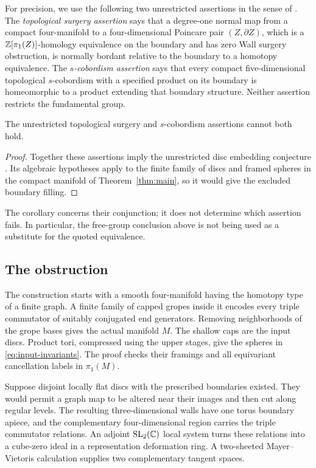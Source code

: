 For precision, we use the following two unrestricted assertions in
the sense of \cite[Conjectures~1.5--1.6]{KPT2021}. The
\emph{topological surgery assertion} says that a degree-one normal
map from a compact four-manifold to a four-dimensional Poincare pair
$(Z,\partial Z)$, which is a $\mathbb Z[\pi_1(Z)]$-homology equivalence on the boundary and has
zero Wall surgery obstruction, is normally bordant relative to the
boundary to a homotopy equivalence. The \emph{$s$-cobordism assertion}
says that every compact five-dimensional topological $s$-cobordism
with a specified product on its boundary is homeomorphic to a product
extending that boundary structure. Neither assertion restricts the
fundamental group.

\begin{corollary}\label{cor:surgery-conjunction}
The unrestricted topological surgery and $s$-cobordism assertions
cannot both hold.
\end{corollary}
\begin{proof}
Together these assertions imply the unrestricted disc embedding
conjecture \cite[Section~3]{KPT2021}. Its algebraic hypotheses apply
to the finite family of discs and framed spheres in the compact
manifold of Theorem~\ref{thm:main}, so it
would give the excluded boundary filling.
\end{proof}

The corollary concerns their conjunction; it does not determine which
assertion fails. In particular, the free-group conclusion above is
not being used as a substitute for the quoted equivalence.

\subsection{The obstruction}
The construction starts with a smooth four-manifold having the homotopy type of a finite graph. A finite family of capped gropes inside it encodes every triple commutator of suitably conjugated end generators. Removing neighborhoods of the grope bases gives the actual manifold $M$. The shallow caps are the input discs. Product tori, compressed using the upper stages, give the spheres in \eqref{eq:input-invariants}. The proof checks their framings and all equivariant cancellation labels in $\pi_1(M)$.

Suppose disjoint locally flat discs with the prescribed boundaries existed. They would permit a graph map to be altered near their images and then cut along regular levels. The resulting three-dimensional walls have one torus boundary apiece, and the complementary four-dimensional region carries the triple commutator relations. An adjoint $\operatorname{SL}_2(\mathbb C)$ local system turns these relations into a cube-zero ideal in a representation deformation ring. A two-sheeted Mayer--Vietoris calculation supplies two complementary tangent spaces.

